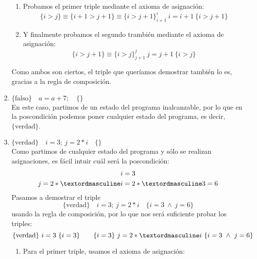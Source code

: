 \begin{ejercicio}
\begin{enumerate}
                \begin{enumerate}
                    \item Probamos el primer triple mediante el axioma de asignación:
                        \begin{equation*}
                            \{i>j\} \equiv \{i+1>j+1\} \equiv \{i>j+1\}^i_{i+1}\ i=i+1\ \{i>j+1\}
                        \end{equation*}
                    \item Y finalmente probamos el segundo trambién mediante el axioma de asignación:
                        \begin{equation*}
                            \{i>j+1\} \equiv \{i>j\}^j_{j+1}\ j=j+1\ \{i>j\}
                        \end{equation*}
                \end{enumerate}
                Como ambos son ciertos, el triple que queríamos demostrar también lo es, gracias a la regla de composición.
        \item $\{\text{falso}\} \quad a = a + 7; \quad \{ \}$\\
            En este caso, partimos de un estado del programa inalcanzable, por lo que en la poscondición podemos poner cualquier estado del programa, es decir, $\{\text{verdad}\}$.
        \item $\{\text{verdad}\} \quad i = 3;~j = 2 \ast i \quad \{ \}$\\
            Como partimos de cualquier estado del programa y sólo se realizan asignaciones, es fácil intuir cuál será la poscondición:
            \begin{gather*}
                i = 3 \\
                j = 2\astº i = 2\astº 3 = 6
            \end{gather*}
            Pasamos a demostrar el triple
            \begin{equation*}
                \{\text{verdad}\} \quad i = 3;~j = 2 \ast i \quad \{i=3\ \land\ j=6\}
            \end{equation*}
            usando la regla de composición, por lo que nos será suficiente probar los triples:
            \begin{equation*}
                \{\text{verdad}\}\ i=3\ \{i=3\} \qquad \{i=3\}\ j=2\astº i\ \{i=3\ \land\ j=6\}
            \end{equation*}
            \begin{enumerate}
                \item Para el primer triple, usamos el axioma de asignación:

\end{enumerate}
\end{enumerate}
\end{ejercicio}
